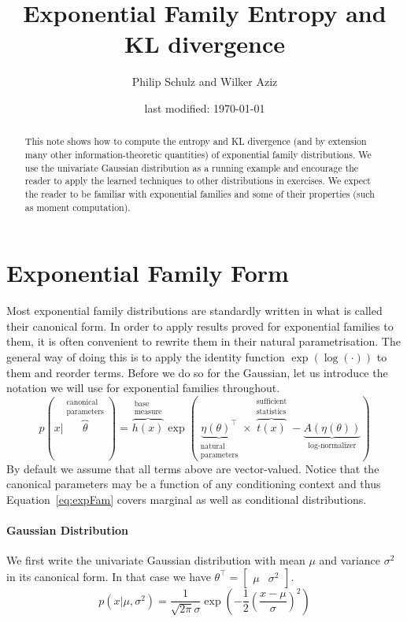 \documentclass[a4paper, 11pt]{article}
\author{Philip Schulz and Wilker Aziz}
\title{Exponential Family Entropy and KL divergence}
\date{last modified: \today}
\begin{document}
\maketitle

\begin{abstract}
This note shows how to compute the entropy and KL divergence (and by extension many other information-theoretic quantities) of 
exponential family distributions. We use the univariate Gaussian distribution as a running example and encourage the reader to
apply the learned techniques to other distributions in exercises. We expect the reader to be familiar with exponential families 
and some of their properties (such as moment computation).
\end{abstract}

\section{Exponential Family Form}

Most exponential family distributions are standardly written in what is called their canonical form. 
In order to apply results proved for 
exponential families to them, it is often convenient to rewrite them in their natural parametrisation. The general way of doing
this is to apply the identity function $ \exp(\log(\cdot)) $ to them and reorder terms. Before we do so for the Gaussian, let us
introduce the notation we will use for exponential families throughout.
\begin{equation} \label{eq:expFam}
p(x|\overbrace{\theta}^{\substack{\text{canonical} \\ \text{parameters}}}) = \overbrace{h(x)}^{\substack{\text{base} \\ \text{measure}}} \exp\left( \underbrace{\eta(\theta)^{\top}}_{\substack{\text{natural} \\ \text{parameters}}} \times \overbrace{t(x)}^{\substack{\text{sufficient} \\ \text{statistics}}}  -\underbrace{A(\eta(\theta))}_{\text{log-normalizer}} \right)
\end{equation}
By default we assume that all terms above are vector-valued. Notice that the canonical parameters may be a function of any conditioning
context and thus Equation~\eqref{eq:expFam} covers marginal as well as conditional distributions.

\paragraph{Gaussian Distribution} We first write the univariate Gaussian distribution 
with mean $ \mu $ and variance $ \sigma^{2} $ in its 
canonical form. In that case we have $ \theta^{\top} = \begin{bmatrix} \mu & \sigma^{2} \end{bmatrix} $.
\begin{equation}\label{eq:canonicalGaussian}
p(x|\mu, \sigma^{2}) = \frac{1}{\sqrt{2\pi}\sigma} \exp \left(-\frac{1}{2}\left(\frac{x - \mu}{\sigma}\right)^{2}\right)
\end{equation}
\end{document}
